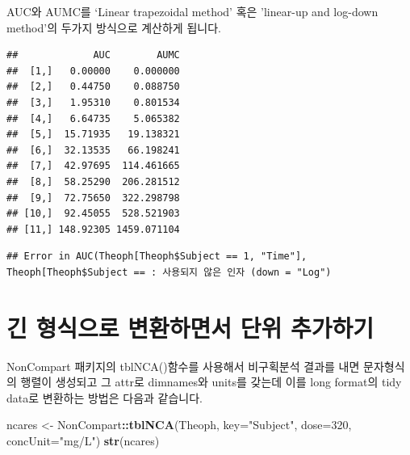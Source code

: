 \documentclass[12pt,]{krantz}
\newenvironment{Shaded}{\begin{snugshade}}{\end{snugshade}}
\newcommand{\KeywordTok}[1]{\textcolor[rgb]{0.13,0.29,0.53}{\textbf{#1}}}
\newcommand{\DataTypeTok}[1]{\textcolor[rgb]{0.13,0.29,0.53}{#1}}
\newcommand{\DecValTok}[1]{\textcolor[rgb]{0.00,0.00,0.81}{#1}}
\newcommand{\StringTok}[1]{\textcolor[rgb]{0.31,0.60,0.02}{#1}}
\newcommand{\OperatorTok}[1]{\textcolor[rgb]{0.81,0.36,0.00}{\textbf{#1}}}
\newcommand{\NormalTok}[1]{#1}
\theoremstyle{definition}
\theoremstyle{definition}
\theoremstyle{definition}
\theoremstyle{remark}
\begin{document}
AUC와 AUMC를 `Linear trapezoidal method' 혹은 'linear-up and log-down
method'의 두가지 방식으로 계산하게 됩니다.

\begin{Shaded}
\end{Shaded}

\begin{verbatim}
##             AUC        AUMC
##  [1,]   0.00000    0.000000
##  [2,]   0.44750    0.088750
##  [3,]   1.95310    0.801534
##  [4,]   6.64735    5.065382
##  [5,]  15.71935   19.138321
##  [6,]  32.13535   66.198241
##  [7,]  42.97695  114.461665
##  [8,]  58.25290  206.281512
##  [9,]  72.75650  322.298798
## [10,]  92.45055  528.521903
## [11,] 148.92305 1459.071104
\end{verbatim}

\begin{Shaded}
\end{Shaded}

\begin{verbatim}
## Error in AUC(Theoph[Theoph$Subject == 1, "Time"], Theoph[Theoph$Subject == : 사용되지 않은 인자 (down = "Log")
\end{verbatim}

\section{긴 형식으로 변환하면서 단위 추가하기}\label{long-format}

NonCompart 패키지의 tblNCA()함수를 사용해서 비구획분석 결과를 내면
문자형식의 행렬이 생성되고 그 attr로 dimnames와 units를 갖는데 이를 long
format의 tidy data로 변환하는 방법은 다음과 같습니다.

\begin{Shaded}
\begin{Highlighting}[]
\NormalTok{ncares <-}\StringTok{ }\NormalTok{NonCompart}\OperatorTok{::}\KeywordTok{tblNCA}\NormalTok{(Theoph, }\DataTypeTok{key=}\StringTok{"Subject"}\NormalTok{, }\DataTypeTok{dose=}\DecValTok{320}\NormalTok{, }\DataTypeTok{concUnit=}\StringTok{"mg/L"}\NormalTok{)}
\KeywordTok{str}\NormalTok{(ncares)}
\end{Highlighting}
\end{Shaded}
\end{document}
